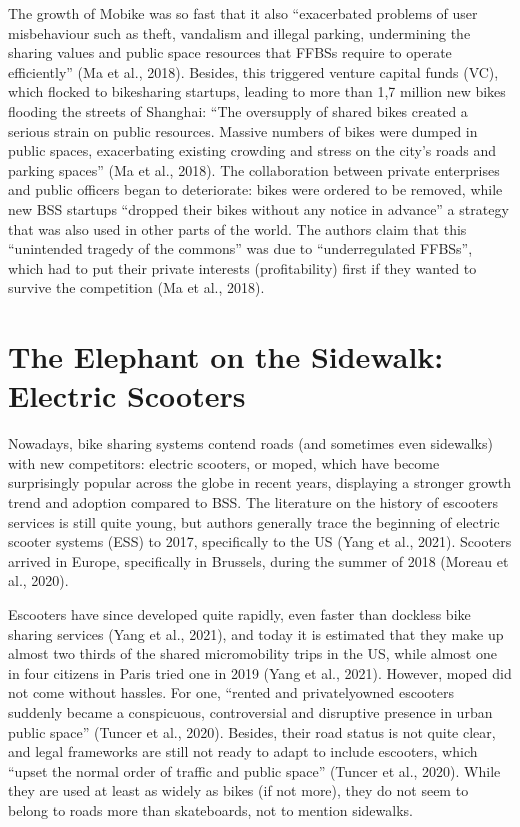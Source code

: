 \documentclass[letterpaper,10pt,english]{jupyterBook}
\begin{document}
\sphinxAtStartPar
The growth of Mobike was so fast that it also “exacerbated problems of user misbehaviour such as theft, vandalism and illegal parking, undermining the sharing values and public space resources that FFBSs require to operate efficiently” (Ma et al., 2018). Besides, this triggered venture capital funds (VC), which flocked to bike\sphinxhyphen{}sharing startups, leading to more than 1,7 million new bikes flooding the streets of Shanghai: “The oversupply of shared bikes created a serious strain on public resources. Massive numbers of bikes were dumped in public spaces, exacerbating existing crowding and stress on the city’s roads and parking spaces” (Ma et al., 2018). The collaboration between private enterprises and public officers began to deteriorate: bikes were ordered to be removed, while new BSS startups “dropped their bikes without any notice in advance” \sphinxhyphen{} a strategy that was also used in other parts of the world. The authors claim that this “unintended tragedy of the commons” was due to “under\sphinxhyphen{}regulated FFBSs”, which had to put their private interests (profitability) first if they wanted to survive the competition (Ma et al., 2018).


\section{The Elephant on the Sidewalk: Electric Scooters}
\label{\detokenize{02-bikesharing_and_bikemi:the-elephant-on-the-sidewalk-electric-scooters}}
\sphinxAtStartPar
Nowadays, bike sharing systems contend roads (and sometimes even sidewalks) with new competitors: electric scooters, or moped, which have become surprisingly popular across the globe in recent years, displaying a stronger growth trend and adoption compared to BSS. The literature on the history of e\sphinxhyphen{}scooters services is still quite young, but authors generally trace the beginning of electric scooter systems (ESS) to 2017, specifically to the US (Yang et al., 2021). Scooters arrived in Europe, specifically in Brussels, during the summer of 2018 (Moreau et al., 2020).

\sphinxAtStartPar
E\sphinxhyphen{}scooters have since developed quite rapidly, even faster than dockless bike sharing services (Yang et al., 2021), and today it is estimated that they make up almost two thirds of the shared micromobility trips in the US, while almost one in four citizens in Paris tried one in 2019 (Yang et al., 2021). However, moped did not come without hassles. For one, “rented and privately\sphinxhyphen{}owned e\sphinxhyphen{}scooters suddenly became a conspicuous, controversial and disruptive presence in urban public space” (Tuncer et al., 2020). Besides, their road status is not quite clear, and legal frameworks are still not ready to adapt to include e\sphinxhyphen{}scooters, which “upset the normal order of traffic and public space” (Tuncer et al., 2020). While they are used at least as widely as bikes (if not more), they do not seem to belong to roads more than skateboards, not to mention sidewalks.
\end{document}
